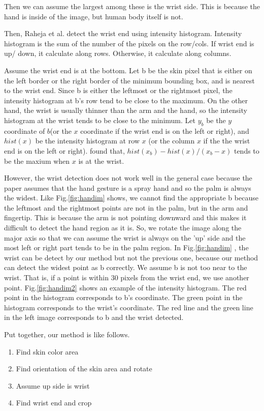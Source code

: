 Then we can assume the largest among these is the wrist side. This is because the hand is inside of the image, but human body itself is not. 

Then, Raheja et al. detect the wrist end using intensity histogram. Intensity histogram is the sum of the number of the pixels on the row/cols. If wrist end is up/ down, it calculate along rows. Otherwise, it calculate along columns.

Assume the wrist end is at the bottom. Let b be the skin pixel that is either on the left border or the right border of the minimum bounding box, and is nearest to the wrist end. Since b is either the leftmost or the rightmost pixel, the intensity histogram at b's row tend to be close to the maximum. On the other hand, the wrist is usually thinner than the arm and the hand, so the intensity histogram at the wrist tends to be close to the minimum. Let $y_b$ be the $y$ coordinate of $b$(or the $x$ coordinate if the wrist end is on the left or right), and $hist(x)$ be the intensity histogram at row $x$ (or the column $x$ if the the wrist end is on the left or right). \cite{ra11} found that, $hist(x_b) - hist(x)/(x_b-x)$ tends to be the maxium when $x$ is at the wrist. 

However, the wrist detection does not work well in the general case because the paper assumes that  the hand gesture is a  spray hand and so the palm is always the widest. Like Fig.\ref{fig:handim} shows, we cannot find the appropriate b because the leftmost and the rightmost points are not in the palm, but in the arm and fingertip.
This is because the arm is not pointing downward and this makes it difficult to detect the hand region as it is. 
So, we rotate the image along the major axis so that we can assume the wrist is always on the 'up' side and the most left or right part tends to be in the palm region.
In Fig.\ref{fig:handim} , the wrist can be detect by our method but not the previous one, because our method can detect the widest point as b correctly. 
We assume b is not too near to the wrist. That is, if a point is within 30 pixels from the wrist end, we use another point.
Fig.\ref{fig:handim2} shows an example of the intensity histogram. The red point in the histogram corresponds to b's coordinate. The green point in the histogram corresponds to the wrist's coordinate. The red line and the green line in the left image corresponds to b and the wrist detected.

Put together, our method is like follows.
\begin{enumerate}
  \item Find skin color area
  \item Find orientation of the skin area and rotate
  \item Assume up side is wrist
  \item Find wrist end and crop
\end{enumerate}

